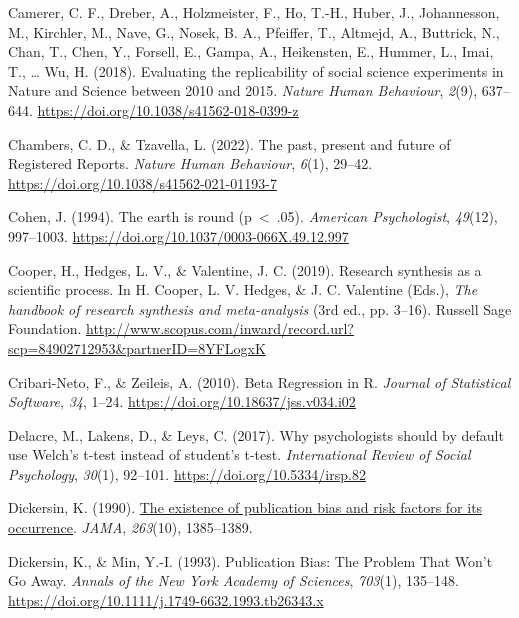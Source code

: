\documentclass[
  12pt,
]{scrartcl}
\newlength{\cslhangindent}
\newenvironment{CSLReferences}[2] %
 {\begin{list}{}{%
  \setlength{\itemindent}{0pt}
  \setlength{\leftmargin}{0pt}
  \setlength{\parsep}{0pt}
  \ifodd #1
   \setlength{\leftmargin}{\cslhangindent}
   \setlength{\itemindent}{-1\cslhangindent}
  \fi
  \setlength{\itemsep}{#2\baselineskip}}}
 {\end{list}}
\begin{document}
\begin{CSLReferences}{1}{0}
Camerer, C. F., Dreber, A., Holzmeister, F., Ho, T.-H., Huber, J.,
Johannesson, M., Kirchler, M., Nave, G., Nosek, B. A., Pfeiffer, T.,
Altmejd, A., Buttrick, N., Chan, T., Chen, Y., Forsell, E., Gampa, A.,
Heikensten, E., Hummer, L., Imai, T., \ldots{} Wu, H. (2018). Evaluating
the replicability of social science experiments in {Nature} and
{Science} between 2010 and 2015. \emph{Nature Human Behaviour},
\emph{2}(9), 637--644. \url{https://doi.org/10.1038/s41562-018-0399-z}

Chambers, C. D., \& Tzavella, L. (2022). The past, present and future of
{Registered} {Reports}. \emph{Nature Human Behaviour}, \emph{6}(1),
29--42. \url{https://doi.org/10.1038/s41562-021-01193-7}

Cohen, J. (1994). The earth is round (p {\textless{}} .05).
\emph{American Psychologist}, \emph{49}(12), 997--1003.
\url{https://doi.org/10.1037/0003-066X.49.12.997}

Cooper, H., Hedges, L. V., \& Valentine, J. C. (2019). Research
synthesis as a scientific process. In H. Cooper, L. V. Hedges, \& J. C.
Valentine (Eds.), \emph{The handbook of research synthesis and
meta-analysis} (3rd ed., pp. 3--16). Russell Sage Foundation.
\url{http://www.scopus.com/inward/record.url?scp=84902712953&partnerID=8YFLogxK}

Cribari-Neto, F., \& Zeileis, A. (2010). Beta {Regression} in {R}.
\emph{Journal of Statistical Software}, \emph{34}, 1--24.
\url{https://doi.org/10.18637/jss.v034.i02}

Delacre, M., Lakens, D., \& Leys, C. (2017). Why psychologists should by
default use {Welch}'s t-test instead of student's t-test.
\emph{International Review of Social Psychology}, \emph{30}(1), 92--101.
\url{https://doi.org/10.5334/irsp.82}

Dickersin, K. (1990).
\href{https://www.ncbi.nlm.nih.gov/pubmed/2406472}{The existence of
publication bias and risk factors for its occurrence}. \emph{JAMA},
\emph{263}(10), 1385--1389.

Dickersin, K., \& Min, Y.-I. (1993). Publication {Bias}: {The} {Problem}
{That} {Won}'t {Go} {Away}. \emph{Annals of the New York Academy of
Sciences}, \emph{703}(1), 135--148.
\url{https://doi.org/10.1111/j.1749-6632.1993.tb26343.x}


\end{CSLReferences}
\end{document}
